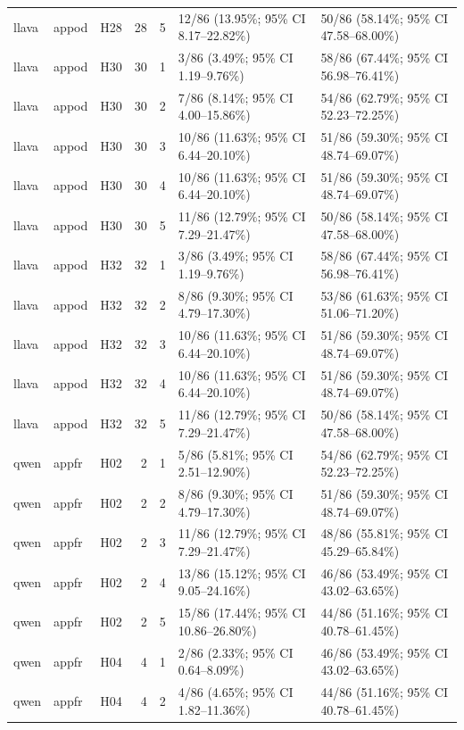 \begin{longtable}{lllrrll}
llava & appod & H28 & 28 & 5 & 12/86 (13.95\%; 95\% CI 8.17–22.82\%) & 50/86 (58.14\%; 95\% CI 47.58–68.00\%) \\
llava & appod & H30 & 30 & 1 & 3/86 (3.49\%; 95\% CI 1.19–9.76\%) & 58/86 (67.44\%; 95\% CI 56.98–76.41\%) \\
llava & appod & H30 & 30 & 2 & 7/86 (8.14\%; 95\% CI 4.00–15.86\%) & 54/86 (62.79\%; 95\% CI 52.23–72.25\%) \\
llava & appod & H30 & 30 & 3 & 10/86 (11.63\%; 95\% CI 6.44–20.10\%) & 51/86 (59.30\%; 95\% CI 48.74–69.07\%) \\
llava & appod & H30 & 30 & 4 & 10/86 (11.63\%; 95\% CI 6.44–20.10\%) & 51/86 (59.30\%; 95\% CI 48.74–69.07\%) \\
llava & appod & H30 & 30 & 5 & 11/86 (12.79\%; 95\% CI 7.29–21.47\%) & 50/86 (58.14\%; 95\% CI 47.58–68.00\%) \\
llava & appod & H32 & 32 & 1 & 3/86 (3.49\%; 95\% CI 1.19–9.76\%) & 58/86 (67.44\%; 95\% CI 56.98–76.41\%) \\
llava & appod & H32 & 32 & 2 & 8/86 (9.30\%; 95\% CI 4.79–17.30\%) & 53/86 (61.63\%; 95\% CI 51.06–71.20\%) \\
llava & appod & H32 & 32 & 3 & 10/86 (11.63\%; 95\% CI 6.44–20.10\%) & 51/86 (59.30\%; 95\% CI 48.74–69.07\%) \\
llava & appod & H32 & 32 & 4 & 10/86 (11.63\%; 95\% CI 6.44–20.10\%) & 51/86 (59.30\%; 95\% CI 48.74–69.07\%) \\
llava & appod & H32 & 32 & 5 & 11/86 (12.79\%; 95\% CI 7.29–21.47\%) & 50/86 (58.14\%; 95\% CI 47.58–68.00\%) \\
qwen & appfr & H02 & 2 & 1 & 5/86 (5.81\%; 95\% CI 2.51–12.90\%) & 54/86 (62.79\%; 95\% CI 52.23–72.25\%) \\
qwen & appfr & H02 & 2 & 2 & 8/86 (9.30\%; 95\% CI 4.79–17.30\%) & 51/86 (59.30\%; 95\% CI 48.74–69.07\%) \\
qwen & appfr & H02 & 2 & 3 & 11/86 (12.79\%; 95\% CI 7.29–21.47\%) & 48/86 (55.81\%; 95\% CI 45.29–65.84\%) \\
qwen & appfr & H02 & 2 & 4 & 13/86 (15.12\%; 95\% CI 9.05–24.16\%) & 46/86 (53.49\%; 95\% CI 43.02–63.65\%) \\
qwen & appfr & H02 & 2 & 5 & 15/86 (17.44\%; 95\% CI 10.86–26.80\%) & 44/86 (51.16\%; 95\% CI 40.78–61.45\%) \\
qwen & appfr & H04 & 4 & 1 & 2/86 (2.33\%; 95\% CI 0.64–8.09\%) & 46/86 (53.49\%; 95\% CI 43.02–63.65\%) \\
qwen & appfr & H04 & 4 & 2 & 4/86 (4.65\%; 95\% CI 1.82–11.36\%) & 44/86 (51.16\%; 95\% CI 40.78–61.45\%) \\

\end{longtable}
